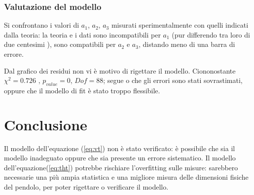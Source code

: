 \documentclass{article}
\begin{document}
\subsubsection{Valutazione del modello}

Si confrontano i valori di $a_1$, $a_2$, $a_3$ misurati sperimentalmente con quelli indicati dalla teoria: la teoria e i dati sono incompatibili per $a_1$ (pur differendo tra loro di due centesimi ), sono compatibili per $a_2$ e $a_3$, distando meno di una barra di errore. 


Dal grafico dei residui non vi è motivo di rigettare il modello.
Ciononostante  $\chi^2=0.726$ , $p_{value}=0$, $Dof=88$; segue o che gli errori sono stati sovrastimati, oppure che il modello di fit è stato troppo flessibile.



\section{Conclusione}

Il modello dell'equazione (\ref{eq:vt}) non è stato verificato: è possibile che sia il modello inadeguato oppure che sia presente un errore sistematico.
Il modello dell'equazione(\ref{eq:tht}) potrebbe rischiare l'overfitting sulle misure: sarebbero necessarie una più ampia statistica e una migliore misura delle dimensioni fisiche del pendolo, per poter rigettare o verificare il modello.
\end{document}
